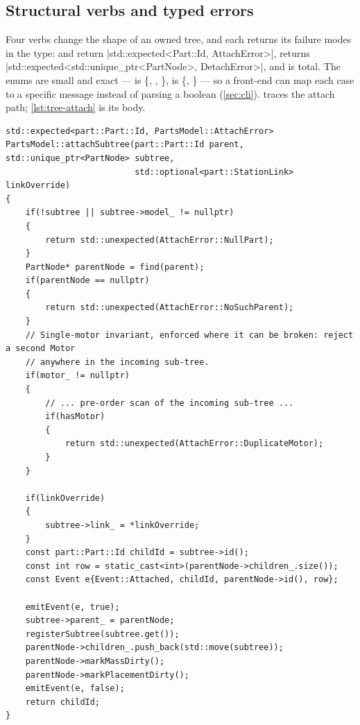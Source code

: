 \subsection{Structural verbs and typed errors}\label{sec:tree-verbs}

Four verbs change the shape of an owned tree, and each returns its failure modes in the type:
 and  return
\cppinline|std::expected<Part::Id, AttachError>|,  returns
\cppinline|std::expected<std::unique_ptr<PartNode>, DetachError>|, and  is
total. The enums are small and exact ---  is
\{, , \},  is
\{, \} --- so a front-end can map each case to a specific message
instead of parsing a boolean (\cref{sec:cli}).  traces the attach path;
\cref{lst:tree-attach} is its body.


\begin{listing}[htbp]
\begin{verbatim}
std::expected<part::Part::Id, PartsModel::AttachError>
PartsModel::attachSubtree(part::Part::Id parent, std::unique_ptr<PartNode> subtree,
                          std::optional<part::StationLink> linkOverride)
{
    if(!subtree || subtree->model_ != nullptr)
    {
        return std::unexpected(AttachError::NullPart);
    }
    PartNode* parentNode = find(parent);
    if(parentNode == nullptr)
    {
        return std::unexpected(AttachError::NoSuchParent);
    }
    // Single-motor invariant, enforced where it can be broken: reject a second Motor
    // anywhere in the incoming sub-tree.
    if(motor_ != nullptr)
    {
        // ... pre-order scan of the incoming sub-tree ...
        if(hasMotor)
        {
            return std::unexpected(AttachError::DuplicateMotor);
        }
    }

    if(linkOverride)
    {
        subtree->link_ = *linkOverride;
    }
    const part::Part::Id childId = subtree->id();
    const int row = static_cast<int>(parentNode->children_.size());
    const Event e{Event::Attached, childId, parentNode->id(), row};

    emitEvent(e, true);
    subtree->parent_ = parentNode;
    registerSubtree(subtree.get());
    parentNode->children_.push_back(std::move(subtree));
    parentNode->markMassDirty();
    parentNode->markPlacementDirty();
    emitEvent(e, false);
    return childId;
}
\end{verbatim}
\caption{, lightly elided
(--350): guards first, then the event-bracketed adoption.}
\label{lst:tree-attach}
\end{listing}

